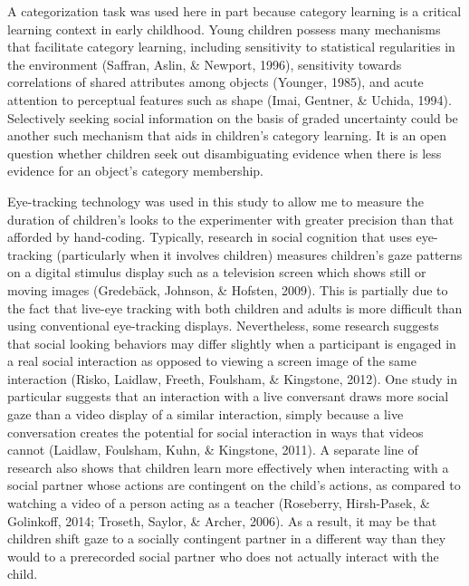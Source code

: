 \documentclass[,man,floatsintext]{apa6}
\begin{document}
A categorization task was used here in part because category learning is a critical learning context in early childhood. Young children possess many mechanisms that facilitate category learning, including sensitivity to statistical regularities in the environment (Saffran, Aslin, \& Newport, 1996), sensitivity towards correlations of shared attributes among objects (Younger, 1985), and acute attention to perceptual features such as shape (Imai, Gentner, \& Uchida, 1994). Selectively seeking social information on the basis of graded uncertainty could be another such mechanism that aids in children's category learning. It is an open question whether children seek out disambiguating evidence when there is less evidence for an object's category membership.

Eye-tracking technology was used in this study to allow me to measure the duration of children's looks to the experimenter with greater precision than that afforded by hand-coding. Typically, research in social cognition that uses eye-tracking (particularly when it involves children) measures children's gaze patterns on a digital stimulus display such as a television screen which shows still or moving images (Gredebäck, Johnson, \& Hofsten, 2009). This is partially due to the fact that live-eye tracking with both children and adults is more difficult than using conventional eye-tracking displays. Nevertheless, some research suggests that social looking behaviors may differ slightly when a participant is engaged in a real social interaction as opposed to viewing a screen image of the same interaction (Risko, Laidlaw, Freeth, Foulsham, \& Kingstone, 2012). One study in particular suggests that an interaction with a live conversant draws more social gaze than a video display of a similar interaction, simply because a live conversation creates the potential for social interaction in ways that videos cannot (Laidlaw, Foulsham, Kuhn, \& Kingstone, 2011). A separate line of research also shows that children learn more effectively when interacting with a social partner whose actions are contingent on the child's actions, as compared to watching a video of a person acting as a teacher (Roseberry, Hirsh-Pasek, \& Golinkoff, 2014; Troseth, Saylor, \& Archer, 2006). As a result, it may be that children shift gaze to a socially contingent partner in a different way than they would to a prerecorded social partner who does not actually interact with the child.
\end{document}
